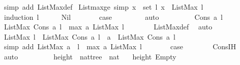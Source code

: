 \begin{isabellebody}
\ {\isacharparenleft}simp\ add{\isacharcolon}\ ListMax{\isacharunderscore}def{\isacharparenright}%
\endisatagproof
{\isafoldproof}%
%
\isadelimproof
\isanewline
%
\endisadelimproof
\isanewline
{}\isamarkupfalse%
\ Listmax{\isacharunderscore}ge\ {\isacharbrackleft}simp{\isacharbrackright}{\isacharcolon}\ {\isachardoublequoteopen}{\isasymforall}x\ {\isasymin}\ set\ l{\isachardot}\ x\ {\isasymle}\ ListMax\ l{\isachardoublequoteclose}\ \ \ \ \isanewline
%
\isadelimproof
\ \ %
\endisadelimproof
%
\isatagproof
{}\isamarkupfalse%
\ {\isacharparenleft}induction\ l{\isacharparenright}\isanewline
\ \ \ \ \isamarkupfalse%
\ Nil\isanewline
\ \ \ \ \isamarkupfalse%
\ \isamarkupfalse%
\ {\isacharquery}case\ \isanewline
\ \ \ \ \ \ \isamarkupfalse%
\ auto\ \isanewline
\ \ \isamarkupfalse%
\isanewline
\ \ \ \ \isamarkupfalse%
\ {\isacharparenleft}Cons\ a\ l{\isacharparenright}\isanewline
\ \ \ \ \isamarkupfalse%
\ {\isachardoublequoteopen}ListMax\ {\isacharparenleft}Cons\ a\ l{\isacharparenright}\ {\isacharequal}\ max\ a\ {\isacharparenleft}ListMax\ l{\isacharparenright}{\isachardoublequoteclose}\isanewline
\ \ \ \ \ \ \isamarkupfalse%
\ ListMax{\isacharunderscore}def\ \isamarkupfalse%
\ auto\isanewline
\ \ \ \ \isamarkupfalse%
\ {\isachardoublequoteopen}ListMax\ l\ {\isasymle}\ ListMax\ {\isacharparenleft}Cons\ a\ l{\isacharparenright}\ {\isasymand}\ a\ {\isasymle}\ ListMax\ {\isacharparenleft}Cons\ a\ l{\isacharparenright}{\isachardoublequoteclose}\isanewline
\ \ \ \ \ \ \isamarkupfalse%
\ {\isacharparenleft}simp\ add{\isacharcolon}\ {\isacartoucheopen}ListMax\ {\isacharparenleft}a\ {\isacharhash}\ l{\isacharparenright}\ {\isacharequal}\ max\ a\ {\isacharparenleft}ListMax\ l{\isacharparenright}{\isacartoucheclose}{\isacharparenright}\isanewline
\ \ \ \ \isamarkupfalse%
\ \isamarkupfalse%
\ {\isacharquery}case\isanewline
\ \ \ \ \ \ \isamarkupfalse%
\ Cons{\isachardot}IH\ \isamarkupfalse%
\ auto\ \isanewline
\ \ \isamarkupfalse%
%
\endisatagproof
{\isafoldproof}%
%
\isadelimproof
\isanewline
%
\endisadelimproof
\ \ \ \ \isanewline
{}\isamarkupfalse%
\ height\ {\isacharcolon}{\isacharcolon}\ {\isachardoublequoteopen}nattree\ {\isasymRightarrow}\ nat{\isachardoublequoteclose}\ \isanewline
\ \ {\isachardoublequoteopen}height\ Empty\ {\isacharequal}\ {}{\isachardoublequoteclose}\ \ \isanewline

\end{isabellebody}
